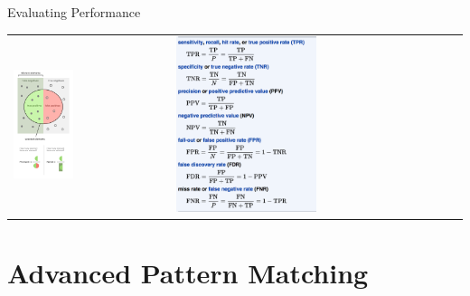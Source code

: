 \documentclass[10pt]{beamer}
\begin{document}
\begin{frame}{Evaluating Performance}
\begin{tabular}{p{5cm} p{7cm}}
    \vspace{0pt}
    \includegraphics[width=0.4\textwidth]{figures/precisionrecall.png}
    &
    \vspace{0pt}
    \includegraphics[width=0.5\textwidth]{figures/precisionrecall-formulas.png}
\end{tabular}
\end{frame}

\section{Advanced Pattern Matching}
\end{document}
